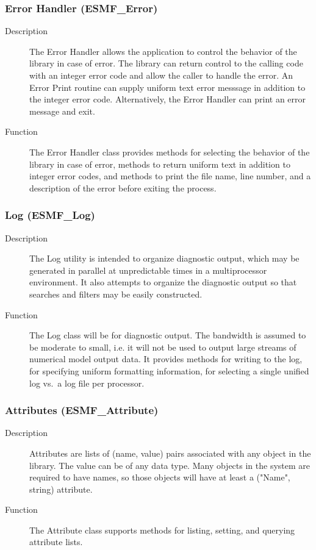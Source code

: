 \subsubsection{Error Handler (ESMF\_Error)}
\label{sec:error} 
\begin{description}
\item [Description] The Error Handler allows the application to control 
the behavior of the library in case of error.  The library can return
control to the calling code with an integer error code and allow the
caller to handle the error.  An Error Print routine can
supply uniform text error messsage in addition to the integer error code.
Alternatively, the Error Handler can print an error message and exit.
\item [Function] The Error Handler class provides methods for selecting
the behavior of the library in case of error, methods to return uniform
text in addition to integer error codes, and methods to print the file
name, line number, and a description of the error before exiting the process.
\end{description}

\subsubsection{Log (ESMF\_Log)}
\label{sec:log} 
\begin{description}
\item [Description] The Log utility is intended to organize diagnostic
output, which may be generated in parallel at unpredictable times in
a multiprocessor environment.  It also attempts to organize
the diagnostic output so that searches and filters may be easily constructed. 
\item [Function] The Log class will be for diagnostic output. 
The bandwidth is assumed to be moderate to small, i.e. it will not be used 
to output large streams of numerical model output data.  
It provides methods for writing to the log, for specifying uniform
formatting information, for selecting a single unified log vs.\  a log 
file per processor.
\end{description}

\subsubsection{Attributes (ESMF\_Attribute)}
\label{sec:attribute} 
\begin{description}
\item [Description] Attributes are lists of (name, value) pairs associated with
any object in the library.  The value can be of any data type.  Many
objects in the system are required to have names, so those objects will
have at least a ("Name", string) attribute.
\item [Function] The Attribute class supports methods for listing,
setting, and querying attribute lists.
\end{description}



